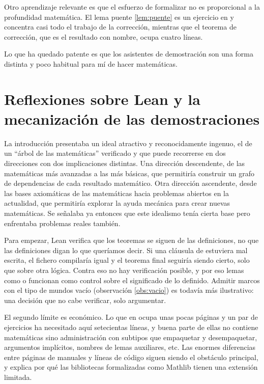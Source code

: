 Otro aprendizaje relevante es que el esfuerzo de formalizar no es proporcional a la profundidad matemática. El lema puente \ref{lem:puente} es un ejercicio en \cite{blackburn} y concentra casi todo el trabajo de la corrección, mientras que el teorema de corrección, que es el resultado con nombre, ocupa cuatro líneas.

Lo que ha quedado patente es que los asistentes de demostración son una forma distinta y poco habitual para mí de hacer matemáticas.

\section{Reflexiones sobre Lean y la mecanización de las demostraciones}\label{reflexiones}

La introducción presentaba un ideal atractivo y reconocidamente ingenuo, el de un ``árbol de las matemáticas'' verificado y que puede recorrerse en dos direcciones con dos implicaciones distintas. Una dirección descendente, de las matemáticas más avanzadas a las más básicas, que permitiría construir un grafo de dependencias de cada resultado matemático. Otra dirección ascendente, desde las bases axiomáticas de las matemáticas hacia problemas abiertos en la actualidad, que permitiría explorar la ayuda mecánica para crear nuevas matemáticas. Se señalaba ya entonces que este idealismo tenía cierta base pero enfrentaba problemas reales también.

Para empezar, Lean verifica que los teoremas se siguen de las definiciones, no que las definiciones digan lo que queríamos decir. Si una cláusula de  estuviera mal escrita, el fichero compilaría igual y el teorema final seguiría siendo cierto, solo que sobre otra lógica. Contra eso no hay verificación posible, y por eso lemas como  o  funcionan como control sobre el significado de lo definido. Admitir marcos con el tipo de mundos vacío (observación \ref{obs:vacio}) es todavía más ilustrativo: una decisión que no cabe verificar, solo argumentar.

El segundo límite es económico. Lo que en \cite{blackburn} ocupa unas pocas páginas y un par de ejercicios ha necesitado aquí setecientas líneas, y buena parte de ellas no contiene matemáticas sino administración con subtipos que empaquetar y desempaquetar, argumentos implícitos, nombres de lemas auxiliares, etc. Las enormes diferencias entre páginas de manuales y líneas de código siguen siendo el obstáculo principal, y explica por qué las bibliotecas formalizadas como Mathlib tienen una extensión limitada.

